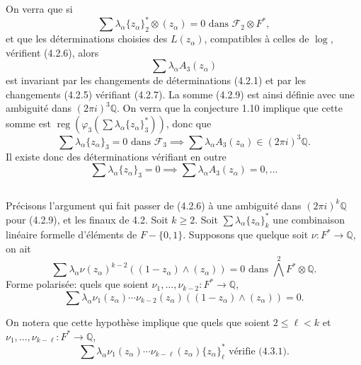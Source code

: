 \documentclass[12pt,a4paper]{article}
\theoremstyle{plain}
\theoremstyle{definition}
\theoremstyle{remark}
\DeclareMathOperator{\reg}{reg}
\newcommand{\Q}{\mathbb{Q}}
\newcommand{\F}{\mathcal{F}}
\begin{document}
On verra que si
\begin{equation}\label{eq:4.2.8}
\sum\lambda_\alpha\{z_\alpha\}_2^*\otimes(z_\alpha)=0\text{ dans }\F_2\otimes F^*,\tag{4.2.8}
\end{equation}
et que les d\'eterminations choisies des $L(z_\alpha)$, compatibles {\`a} celles de $\log$, v\'erifient (4.2.6), alors
\begin{equation}\label{eq:4.2.9}
\sum\lambda_\alpha A_3(z_\alpha)\tag{4.2.9}
\end{equation}
est invariant par les changements de d\'eterminations (4.2.1) et par les changements (4.2.5) v\'erifiant (4.2.7). La somme (4.2.9) est ainsi d\'efinie avec une ambiguit\'e dans $(2\pi i)^3\Q$. On verra que la conjecture 1.10 implique que cette somme est $\reg(\varphi_3(\sum\lambda_\alpha\{z_\alpha\}_3^*))$, donc que
\begin{equation*}
\sum\lambda_\alpha\{z_\alpha\}_3=0\text{ dans }\F_3 \implies \sum\lambda_\alpha A_3(z_\alpha)\in(2\pi i)^3\Q.
\end{equation*}
Il existe donc des d\'eterminations v\'erifiant en outre
\begin{equation*}
\sum\lambda_\alpha\{z_\alpha\}_3=0 \implies \sum\lambda_\alpha A_3(z_\alpha)=0,\ldots
\end{equation*}

\subsection{}

Pr\'ecisons l'argument qui fait passer de (4.2.6) {\`a} une ambiguit\'e dans $(2\pi i)^k\Q$ pour (4.2.9), et les finaux de 4.2. Soit $k\geq 2$. Soit $\sum\lambda_\alpha\{z_\alpha\}_k^*$ une combinaison lin\'eaire formelle d'\'el\'ements de $F-\{0,1\}$. Supposons que quelque soit $\nu:F^*\to\Q$, on ait
\begin{equation}\label{eq:4.3.1}
\sum\lambda_\alpha\nu(z_\alpha)^{k-2}((1-z_\alpha)\wedge(z_\alpha))=0\text{ dans }\bigwedge^2F^*\otimes\Q.\tag{4.3.1}
\end{equation}
Forme polaris\'ee: quels que soient $\nu_1,\ldots,\nu_{k-2}:F^*\to\Q$,
\begin{equation}\label{eq:4.3.2}
\sum\lambda_\alpha\nu_1(z_\alpha)\cdots\nu_{k-2}(z_\alpha)((1-z_\alpha)\wedge(z_\alpha))=0.\tag{4.3.2}
\end{equation}

On notera que cette hypoth\`ese implique que quels que soient $2\leq\ell<k$ et $\nu_1,\ldots,\nu_{k-\ell}:F^*\to\Q$,
\begin{equation}\label{eq:4.3.3}
\sum\lambda_\alpha\nu_1(z_\alpha)\cdots\nu_{k-\ell}(z_\alpha)\{z_\alpha\}_\ell^*\text{ v\'erifie (4.3.1).}\tag{4.3.3}
\end{equation}
\end{document}
